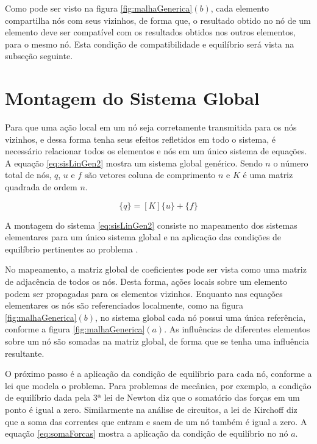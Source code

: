 \documentclass[
    12pt,               %
    openright,          %
    oneside,
    a4paper,            %
    english,            %
    french,             %
    spanish,            %
    brazil              %
    ]{abntex2}
\begin{document}
\begin{apendicesenv}
Como pode ser visto na figura \ref{fig:malhaGenerica}$(b)$, cada elemento compartilha nós com seus vizinhos, de forma que, o resultado obtido no nó de um elemento deve ser compatível com os resultados obtidos nos outros elementos, para o mesmo nó. Esta condição de compatibilidade e equilíbrio será vista na subseção seguinte.

\section{Montagem do Sistema Global}

Para que uma ação local em um nó seja corretamente transmitida para os nós vizinhos, e dessa forma tenha seus efeitos refletidos em todo o sistema, é necessário relacionar todos os elementos e nós em um único sistema de equações. A equação \ref{eq:sisLinGen2} mostra um sistema global genérico. Sendo $n$ o número total de nós, $q$, $u$ e $f$ são vetores coluna de comprimento $n$ e $K$ é uma matriz quadrada de ordem $n$.

\begin{equation}
\label{eq:sisLinGen2}
\{q\} = [K] \{u\} + \{f\}
\end{equation}

A montagem do sistema \ref{eq:sisLinGen2} consiste no mapeamento dos sistemas elementares para um único sistema global e na aplicação das condições de equilíbrio pertinentes ao problema \cite[p. 5]{zien}.

No mapeamento, a matriz global de coeficientes pode ser vista como uma matriz de adjacência de todos os nós. Desta forma, ações locais sobre um elemento podem ser propagadas para os elementos vizinhos.
Enquanto nas equações elementares os nós são referenciados localmente, como na figura \ref{fig:malhaGenerica}$(b)$, no sistema global cada nó possui uma única referência, conforme a figura \ref{fig:malhaGenerica}$(a)$. As influências de diferentes elementos sobre um nó são somadas na matriz global, de forma que se tenha uma influência resultante.

O próximo passo é a aplicação da condição de equilíbrio para cada nó, conforme a lei que modela o problema. Para problemas de mecânica, por exemplo, a condição de equilíbrio dada pela 3ª lei de Newton diz que o somatório das forças em um ponto é igual a zero. Similarmente na análise de circuitos, a lei de Kirchoff diz que a soma das correntes que entram e saem de um nó também é igual a zero. A equação \ref{eq:somaForcas} mostra a aplicação da condição de equilíbrio no nó $a$.



\end{apendicesenv}
\end{document}
